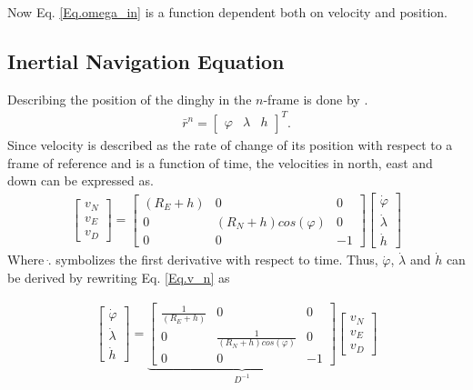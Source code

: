 \noindent Now Eq. \eqref{Eq.omega_in} is a function dependent both on velocity and position.

\subsection{Inertial Navigation Equation}
Describing the position of the dinghy in the $n$-frame is done by \cite{nonlinear}.
\begin{align}
\bar{r}^n=
\begin{bmatrix}
\varphi & \lambda & h
\end{bmatrix}^T.
\end{align}
Since velocity is described as the rate of change of its position with respect to a frame of reference and is a function of time, the velocities in north, east and down can be expressed as.
\begin{align}
\begin{bmatrix}
v_N \\
v_E \\
v_D
\end{bmatrix}
=
\begin{bmatrix}
(R_E+h) & 0 & 0 \\
0 & (R_N+h)cos(\varphi) & 0\\
0 & 0 & -1
\end{bmatrix}
\begin{bmatrix}
\dot{\varphi}\\
\dot{\lambda}\\
\dot{h}
\end{bmatrix}
\label{Eq.v_n}
\end{align}
Where $\dot{.}$ symbolizes the first derivative with respect to time. Thus, $\dot{\varphi}$, $\dot{\lambda}$ and $\dot{h}$ can be derived by rewriting Eq. \eqref{Eq.v_n} as

\begin{align}
\begin{bmatrix}
\dot{\varphi}\\
\dot{\lambda}\\
\dot{h}
\end{bmatrix}
=
\underbrace{\begin{bmatrix}
\frac{1}{(R_E+h)} & 0 & 0 \\
0 & \frac{1}{(R_N+h)cos(\varphi)} & 0\\
0 & 0 & -1
\end{bmatrix}}_{D^{-1}}
\begin{bmatrix}
v_N \\
v_E \\
v_D
\end{bmatrix}
\label{Eq.v_n}
\end{align}

